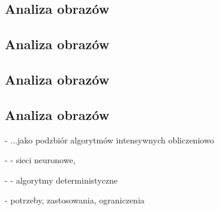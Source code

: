 \subsection{Analiza obrazów}

\subsection{Analiza obrazów}

\subsection{Analiza obrazów}

\subsection{Analiza obrazów}

- ...jako podzbiór algorytmów intensywnych obliczeniowo

- - sieci neuronowe,

- - algorytmy deterministyczne

- potrzeby, zastosowania, ograniczenia
